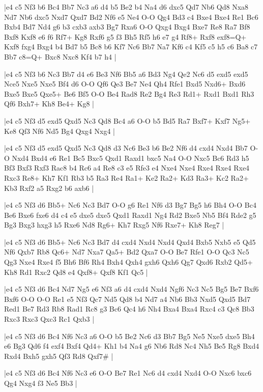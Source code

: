 \whitename{}
\blackname{}
\makegametitle
|e4 c5 Nf3 b6 Bc4 Bb7 Nc3 a6 d4 b5 Be2 b4 Na4 d6 dxc5 Qd7 Nb6 Qd8 Nxa8 Nd7 Nb6 dxc5 Nxd7 Qxd7 Bd2 Nf6 e5 Ne4 O-O Qg4 Bd3 c4 Bxe4 Bxe4 Re1 Bc6 Bxb4 Bd7 Nd4 g6 b3 cxb3 axb3 Bg7 Rxa6 O-O Qxg4 Bxg4 Bxe7 Re8 Ra7 Bf8 Bxf8 Kxf8 e6 f6 Rf7+ Kg8 Rxf6 g5 f3 Bh5 Rf5 h6 e7 g4 Rf8+ Rxf8 exf8=Q+ Kxf8 fxg4 Bxg4 b4 Bd7 b5 Bc8 b6 Kf7 Nc6 Bb7 Na7 Kf6 c4 Kf5 c5 h5 c6 Ba8 c7 Bb7 c8=Q+ Bxc8 Nxc8 Kf4 b7 h4  |

\whitename{}
\blackname{}
\makegametitle
|e4 c5 Nf3 b6 Nc3 Bb7 d4 e6 Be3 Nf6 Bb5 a6 Bd3 Ng4 Qe2 Nc6 d5 exd5 exd5 Nce5 Nxe5 Nxe5 Bf4 d6 O-O Qf6 Qe3 Be7 Ne4 Qh4 Rfe1 Bxd5 Nxd6+ Bxd6 Bxe5 Bxe5 Qxe5+ Be6 Bf5 O-O Be4 Rad8 Re2 Bg4 Re3 Rd1+ Rxd1 Bxd1 Rh3 Qf6 Bxh7+ Kh8 Be4+ Kg8  |

\whitename{}
\blackname{}
\makegametitle
|e4 c5 Nf3 d5 exd5 Qxd5 Nc3 Qd8 Bc4 a6 O-O b5 Bd5 Ra7 Bxf7+ Kxf7 Ng5+ Ke8 Qf3 Nf6 Nd5 Bg4 Qxg4 Nxg4  |

\whitename{}
\blackname{}
\makegametitle
|e4 c5 Nf3 d5 exd5 Qxd5 Nc3 Qd8 d3 Nc6 Be3 b6 Be2 Nf6 d4 cxd4 Nxd4 Bb7 O-O Nxd4 Bxd4 e6 Re1 Bc5 Bxc5 Qxd1 Raxd1 bxc5 Na4 O-O Nxc5 Bc6 Rd3 h5 Bf3 Bxf3 Rxf3 Rac8 b4 Rc6 a4 Re8 c3 e5 Rfe3 e4 Nxe4 Nxe4 Rxe4 Rxe4 Rxe4 Rxc3 Re8+ Kh7 Kf1 Rb3 b5 Ra3 Re4 Ra1+ Ke2 Ra2+ Kd3 Ra3+ Kc2 Ra2+ Kb3 Rxf2 a5 Rxg2 b6 axb6  |

\whitename{}
\blackname{}
\makegametitle
|e4 c5 Nf3 d6 Bb5+ Nc6 Nc3 Bd7 O-O g6 Re1 Nf6 d3 Bg7 Bg5 h6 Bh4 O-O Bc4 Be6 Bxe6 fxe6 d4 c4 e5 dxe5 dxe5 Qxd1 Raxd1 Ng4 Rd2 Bxe5 Nb5 Bf4 Rde2 g5 Bg3 Bxg3 hxg3 h5 Rxe6 Nd8 Rg6+ Kh7 Rxg5 Nf6 Rxe7+ Kh8 Reg7  |

\whitename{}
\blackname{}
\makegametitle
|e4 c5 Nf3 d6 Bb5+ Nc6 Nc3 Bd7 d4 cxd4 Nxd4 Nxd4 Qxd4 Bxb5 Nxb5 e5 Qd5 Nf6 Qxb7 Rb8 Qc6+ Nd7 Nxa7 Qa5+ Bd2 Qxa7 O-O Be7 Rfe1 O-O Qc3 Nc5 Qg3 Nxe4 Rxe4 f5 Bh6 Bf6 Rh4 Bxh4 Qxh4 gxh6 Qxh6 Qg7 Qxd6 Rxb2 Qd5+ Kh8 Rd1 Rxc2 Qd8 e4 Qxf8+ Qxf8 Kf1 Qc5  |

\whitename{}
\blackname{}
\makegametitle
|e4 c5 Nf3 d6 Bc4 Nd7 Ng5 e6 Nf3 a6 d4 cxd4 Nxd4 Ngf6 Nc3 Nc5 Bg5 Be7 Bxf6 Bxf6 O-O O-O Re1 e5 Nf3 Qc7 Nd5 Qd8 b4 Nd7 a4 Nb6 Bb3 Nxd5 Qxd5 Bd7 Red1 Be7 Rd3 Rb8 Rad1 Rc8 g3 Bc6 Qc4 h6 Nh4 Bxa4 Bxa4 Rxc4 c3 Qc8 Bb3 Rxc3 Rxc3 Qxc3 Rc1 Qxb3  |

\whitename{}
\blackname{}
\makegametitle
|e4 c5 Nf3 d6 Bc4 Nf6 Nc3 a6 O-O b5 Be2 Nc6 d3 Bb7 Bg5 Ne5 Nxe5 dxe5 Bh4 e6 Bg3 Qd6 f4 exf4 Bxf4 Qd4+ Kh1 b4 Na4 g6 Nb6 Rd8 Nc4 Nh5 Be5 Rg8 Bxd4 Rxd4 Bxh5 gxh5 Qf3 Rd8 Qxf7\#  |

\whitename{}
\blackname{}
\makegametitle
|e4 c5 Nf3 d6 Bc4 Nf6 Nc3 e6 O-O Be7 Re1 Nc6 d4 cxd4 Nxd4 O-O Nxc6 bxc6 Qg4 Nxg4 f3 Ne5 Bb3  |

